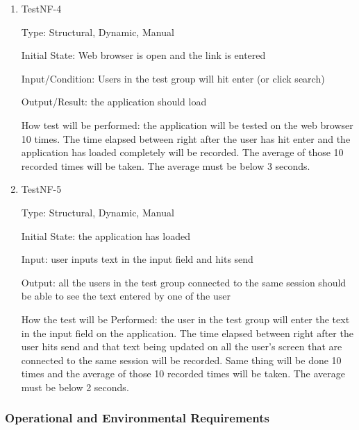 \documentclass[12pt, titlepage]{article}
\begin{document}
\begin{enumerate}

\item{TestNF-4\\}

Type: Structural, Dynamic, Manual

Initial State: Web browser is open and the link is entered
					
Input/Condition:  Users in the test group will hit enter (or click search)
					
Output/Result: the application should load


How test will be performed: the application will be tested on the web browser 10 times. The time elapsed between right after the user has hit enter and the application has loaded completely will be recorded. The average of those 10 recorded times will be taken. The average must be below 3 seconds. 

\item{TestNF-5\\}

Type: Structural, Dynamic, Manual
					
Initial State: the application has loaded 

Input: user inputs text in the input field and hits send
	
Output: all the users in the test group connected to the same session should be able to see the text entered by one of the user  
	
How the test will be Performed: the user in the test group will enter the text in the input field on the application. The time elapsed between right after the user hits send and that text being updated on all the user’s screen that are connected to the same session will be recorded. Same thing will be done 10 times and the average of those 10 recorded times will be taken. The average must be below 2 seconds.    

\end{enumerate}

\subsubsection{Operational and Environmental Requirements}

\end{document}
